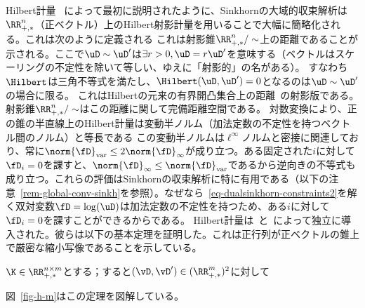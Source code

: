 \begin{rem1}{Hilbert計量}
~\citep{franklin1989scaling}によって最初に説明されたように、Sinkhornの大域的収束解析は$\RR_{+,*}^n$（正ベクトル）上のHilbert射影計量を用いることで大幅に簡略化される。これは次のように定義される
これは射影錐$\RR_{+,*}^n/\sim$上の距離であることが示される。ここで$\uD \sim \uD'$は$\exists r>0, \uD=r\uD'$を意味する（ベクトルはスケーリングの不定性を除いて等しい、ゆえに「射影的」の名がある）。
%
すなわち$\Hilbert$は三角不等式を満たし、$\Hilbert(\uD,\uD')=0$となるのは$\uD \sim \uD'$の場合に限る。
%
これはHilbertの元来の有界開凸集合上の距離~\citep{hilbert1895gerade}の射影版である。
%
射影錐$\RR_{+,*}^n/\sim$はこの距離に関して完備距離空間である。
%
対数変換により、正の錐の半直線上のHilbert計量は変動半ノルム（加法定数の不定性を持つベクトル間のノルム）と等長である
%
この変動半ノルムは$\ell^\infty$ノルムと密接に関連しており、常に$\norm{\fD}_{\text{var}}  \leq 2 \norm{\fD}_\infty$が成り立つ。ある固定された$i$に対して$\fD_i=0$を課すと、$\norm{\fD}_\infty \leq \norm{\fD}_{\text{var}}$であるから逆向きの不等式も成り立つ。これらの評価はSinkhornの収束解析に特に有用である（以下の注意~\ref{rem-global-conv-sinkh}を参照）。なぜなら~\eqref{eq-dualsinkhorn-constraints2}を解く双対変数$\fD=\log(\uD)$は加法定数の不定性を持つため、ある$i$に対して$\fD_i=0$を課すことができるからである。
%
Hilbert計量は~\citep{birkhoff1957extensions}と~\citep{samelson1957perron}によって独立に導入された。彼らは以下の基本定理を証明した。これは正行列が正ベクトルの錐上で厳密な縮小写像であることを示している。


\begin{thm}\label{thm-birkoff}
	$\K \in \RR_{+,*}^{n \times m}$とする；すると$(\vD,\vD') \in (\RR_{+,*}^m)^2$に対して
\end{thm}

図~\ref{fig-h-m}はこの定理を図解している。
\end{rem1}


